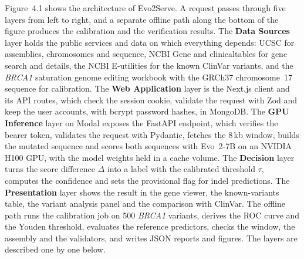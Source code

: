 \vspace{-8pt}
Figure~4.1 shows the architecture of Evo2Serve. A request passes through five layers from left to right, and a separate offline path along the bottom of the figure produces the calibration and the verification results. The \textbf{Data Sources} layer holds the public services and data on which everything depends: UCSC for assemblies, chromosomes and sequence, NCBI Gene and clinicaltables for gene search and details, the NCBI E-utilities for the known ClinVar variants, and the \textit{BRCA1} saturation genome editing workbook with the GRCh37 chromosome~17 sequence for calibration. The \textbf{Web Application} layer is the Next.js client and its API routes, which check the session cookie, validate the request with Zod and keep the user accounts, with bcrypt password hashes, in MongoDB. The \textbf{GPU Inference} layer on Modal exposes the FastAPI endpoint, which verifies the bearer token, validates the request with Pydantic, fetches the 8\,kb window, builds the mutated sequence and scores both sequences with Evo~2-7B on an NVIDIA H100 GPU, with the model weights held in a cache volume. The \textbf{Decision} layer turns the score difference $\Delta$ into a label with the calibrated threshold $\tau$, computes the confidence and sets the provisional flag for indel predictions. The \textbf{Presentation} layer shows the result in the gene viewer, the known-variants table, the variant analysis panel and the comparison with ClinVar. The offline path runs the calibration job on 500 \textit{BRCA1} variants, derives the ROC curve and the Youden threshold, evaluates the reference predictors, checks the window, the assembly and the validators, and writes JSON reports and figures. The layers are described one by one below.

